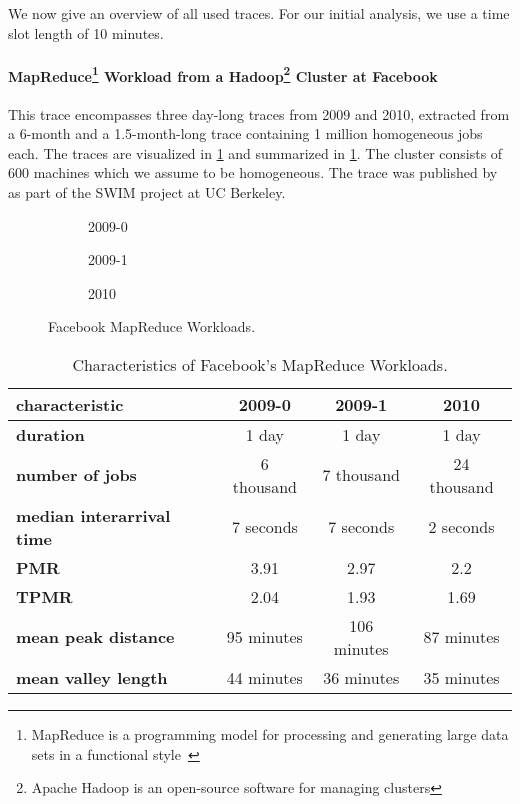 We now give an overview of all used traces. For our initial analysis, we use a time slot length of 10 minutes.

\paragraph{MapReduce\footnote{MapReduce is a programming model for processing and generating large data sets in a functional style~\cite{Dean2004}} Workload from a Hadoop\footnote{Apache Hadoop is an open-source software for managing clusters} Cluster at Facebook~\cite{SWIM2013}} This trace encompasses three day-long traces from 2009 and 2010, extracted from a 6-month and a 1.5-month-long trace containing 1 million homogeneous jobs each. The traces are visualized in \cref{fig:facebook:histogram} and summarized in \cref{tab:facebook}. The cluster consists of 600 machines which we assume to be homogeneous. The trace was published by \citeauthor*{SWIM2013}~\cite{SWIM2013} as part of the SWIM project at UC Berkeley.

\begin{figure}
    \begin{subfigure}[b]{.3425\linewidth}
    \resizebox{\textwidth}{!}{}
    \caption{2009-0}
    \end{subfigure}
    \begin{subfigure}[b]{.32\linewidth}
    \resizebox{\textwidth}{!}{}
    \caption{2009-1}
    \end{subfigure}
    \begin{subfigure}[b]{.32\linewidth}
    \resizebox{\textwidth}{!}{}
    \caption{2010}
    \end{subfigure}
    \caption{Facebook MapReduce Workloads.}
    \label{fig:facebook:histogram}
\end{figure}

\begin{table}
    \centering
    \begin{tabular}{>{\bfseries\centering}l|c|c|c}
        characteristic & 2009-0 & 2009-1 & 2010 \\\hline
        duration & 1 day & 1 day & 1 day \\
        number of jobs & 6 thousand & 7 thousand & 24 thousand \\
        median interarrival time & 7 seconds & 7 seconds & 2 seconds \\
        PMR & 3.91 & 2.97 & 2.2 \\
        TPMR & 2.04 & 1.93 & 1.69 \\
        mean peak distance & 95 minutes & 106 minutes & 87 minutes \\
        mean valley length & 44 minutes & 36 minutes & 35 minutes \\
    \end{tabular}
    \caption{Characteristics of Facebook's MapReduce Workloads.}
    \label{tab:facebook}
\end{table}

